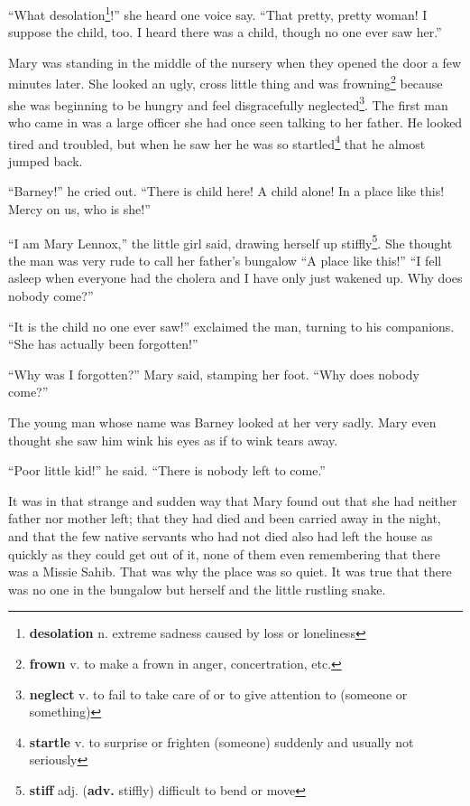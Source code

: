 ``What desolation\footnote{\textbf{desolation} n. extreme sadness caused by loss or loneliness}!'' she heard one voice say. ``That pretty, pretty woman! I suppose the child, too. I heard there was a child, though no one ever saw her.''

Mary was standing in the middle of the nursery when they opened the door a few minutes later. She looked an ugly, cross little thing and was frowning\footnote{\textbf{frown} v. to make a frown in anger, concertration, etc.} because she was beginning to be hungry and feel disgracefully neglected\footnote{\textbf{neglect} v. to fail to take care of or to give attention to (someone or something)}. The first man who came in was a large officer she had once seen talking to her father. He looked tired and troubled, but when he saw her he was so startled\footnote{\textbf{startle} v. to surprise or frighten (someone) suddenly and usually not seriously} that he almost jumped back.

``Barney!'' he cried out. ``There is child here! A child alone! In a place like this! Mercy on us, who is she!''

``I am Mary Lennox,'' the little girl said, drawing herself up stiffly\footnote{\textbf{stiff} adj. (\textbf{adv.} stiffly) difficult to bend or move}. She thought the man was very rude to call her father's bungalow ``A place like this!'' ``I fell asleep when everyone had the cholera and I have only just wakened up. Why does nobody come?''

``It is the child no one ever saw!'' exclaimed the man, turning to his companions. ``She has actually been forgotten!''

``Why was I forgotten?'' Mary said, stamping her foot. ``Why does nobody come?''

The young man whose name was Barney looked at her very sadly. Mary even thought she saw him wink his eyes as if to wink tears away.

``Poor little kid!'' he said. ``There is nobody left to come.''

It was in that strange and sudden way that Mary found out that she had neither father nor mother left; that they had died and been carried away in the night, and that the few native servants who had not died also had left the house as quickly as they could get out of it, none of them even remembering that there was a Missie Sahib. That was why the place was so quiet. It was true that there was no one in the bungalow but herself and the little rustling snake.
